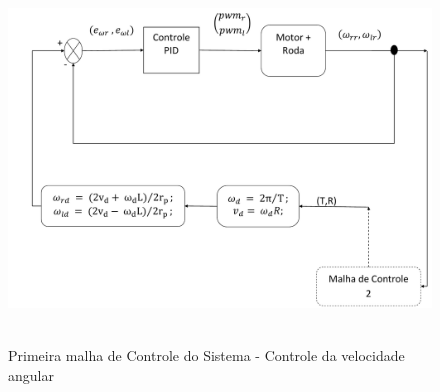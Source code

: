 \begin{figure}[!htb]
	\centering
	\caption{Primeira malha de Controle do Sistema - Controle da velocidade angular}
	\includegraphics[width=1.0\textwidth]{./04-figuras/malha1}
	\
	\label{fig:malha1}
\end{figure}

